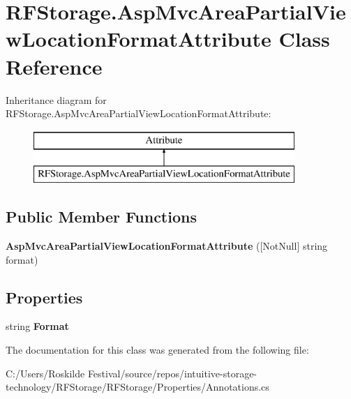 \hypertarget{class_r_f_storage_1_1_asp_mvc_area_partial_view_location_format_attribute}{}\section{R\+F\+Storage.\+Asp\+Mvc\+Area\+Partial\+View\+Location\+Format\+Attribute Class Reference}
\label{class_r_f_storage_1_1_asp_mvc_area_partial_view_location_format_attribute}
Inheritance diagram for R\+F\+Storage.\+Asp\+Mvc\+Area\+Partial\+View\+Location\+Format\+Attribute\+:\begin{figure}[H]
\begin{center}
\leavevmode
\includegraphics[height=2.000000cm]{class_r_f_storage_1_1_asp_mvc_area_partial_view_location_format_attribute}
\end{center}
\end{figure}
\subsection*{Public Member Functions}
\begin{DoxyCompactItemize}
\item 
\mbox{\label{class_r_f_storage_1_1_asp_mvc_area_partial_view_location_format_attribute_a24338e90e79e11bd3738e44ebeff6c56}} 
{\bfseries Asp\+Mvc\+Area\+Partial\+View\+Location\+Format\+Attribute} (\mbox{[}Not\+Null\mbox{]} string format)
\end{DoxyCompactItemize}
\subsection*{Properties}
\begin{DoxyCompactItemize}
\item 
\mbox{\label{class_r_f_storage_1_1_asp_mvc_area_partial_view_location_format_attribute_a9dafa4a5a6d747ff1e48ebdbeb139f26}} 
string {\bfseries Format}
\end{DoxyCompactItemize}


The documentation for this class was generated from the following file\+:\begin{DoxyCompactItemize}
\item 
C\+:/\+Users/\+Roskilde Festival/source/repos/intuitive-\/storage-\/technology/\+R\+F\+Storage/\+R\+F\+Storage/\+Properties/Annotations.\+cs\end{DoxyCompactItemize}
